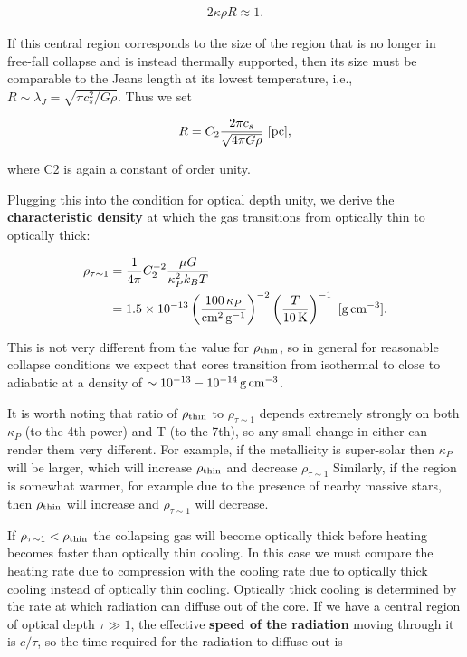 \documentclass[a4paper,10pt]{article}
\begin{document}
\begin{align*}
    2\kappa\rho R \approx 1.
\end{align*}

{\noindent}If this central region corresponds to the size of the region that is no longer in free-fall collapse and is instead thermally supported, then its size must be comparable to the Jeans length at its lowest temperature, i.e., $R\sim\lambda_J = \sqrt{\pi c_s^2/G\rho}$. Thus we set

\begin{align*}
    R = C_2 \frac{2\pi c_s}{\sqrt{4\pi G\rho}} ~ [{\rm pc}],
\end{align*}

{\noindent}where C2 is again a constant of order unity.

{\noindent}Plugging this into the condition for optical depth unity, we derive the \textbf{characteristic density} at which the gas transitions from optically thin to optically thick:

\begin{align*}
    \rho_{\tau\sim1} &= \frac{1}{4\pi} C_2^{-2} \frac{\mu G}{\kappa_P^2k_BT} \\
    &= 1.5\times10^{-13} \left(\frac{100\,\kappa_P}{{\rm cm^2\,g^{-1}}}\right)^{-2} \left(\frac{T}{10\,{\rm K}}\right)^{-1} ~ [{\rm g\,cm^{-3}}].
\end{align*}

{\noindent}This is not very different from the value for $\rho_{\rm thin}$, so in general for reasonable collapse conditions we expect that cores transition from isothermal to close to adiabatic at a density of $\sim10^{-13}-10^{-14}\,{\rm g\,cm^{-3}}$.

{\noindent}It is worth noting that ratio of $\rho_{\rm thin}$ to $\rho_{\tau\sim1}$ depends extremely strongly on both $\kappa_P$ (to the 4th power) and T (to the 7th), so any small change in either can render them very different. For example, if the metallicity is super-solar then $\kappa_P$ will be larger, which will increase $\rho_{\rm thin}$ and decrease $\rho_{\tau\sim1}$ Similarly, if the region is somewhat warmer, for example due to the presence of nearby massive stars, then $\rho_{\rm thin}$ will increase and $\rho_{\tau\sim1}$ will decrease.

{\noindent}If $\rho_{\tau\sim1}<\rho_{\rm thin}$ the collapsing gas will become optically thick before heating becomes faster than optically thin cooling. In this case we must compare the heating rate due to compression with the cooling rate due to optically thick cooling instead of optically thin cooling. Optically thick cooling is determined by the rate at which radiation can diffuse out of the core. If we have a central region of optical depth $\tau\gg1$, the effective \textbf{speed of the radiation} moving through it is $c/\tau$, so the time required for the radiation to diffuse out is
\end{document}
